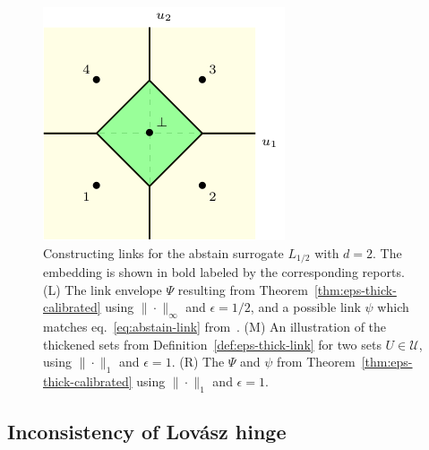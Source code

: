 \documentclass[11pt]{article}
\newcommand{\U}{\mathcal{U}}
\begin{document}
\begin{figure}
\begin{center}
\begin{minipage}{0.32\linewidth}
\end{minipage}\hfill
\begin{minipage}{0.32\linewidth}
\includegraphics[width=\linewidth]{tikz/abstain-link-l1.pdf}
\end{minipage}\hfill
\caption{Constructing links for the abstain surrogate $L_{1/2}$ with $d=2$. The embedding is shown in bold labeled by the corresponding reports. (L) The link envelope $\Psi$ resulting from Theorem~\ref{thm:eps-thick-calibrated} using $\|\cdot\|_\infty$ and $\epsilon = 1/2$, and a possible link $\psi$ which matches eq.~\eqref{eq:abstain-link} from~\cite{ramaswamy2018consistent}.  (M) An illustration of the thickened sets from Definition~\ref{def:eps-thick-link} for two sets $U \in \U$, using $\|\cdot\|_1$ and $\epsilon = 1$. (R) The $\Psi$ and $\psi$ from Theorem~\ref{thm:eps-thick-calibrated} using $\|\cdot\|_1$ and $\epsilon = 1$.}
\label{fig:abstain-links}
\end{center}
\end{figure}


\subsection{Inconsistency of Lov\'asz hinge}
\label{sec:lovasz-hinge}

\newcommand{\dis}{\mathrm{dis}}
\newcommand{\abs}{\mathrm{abs}}
\end{document}
